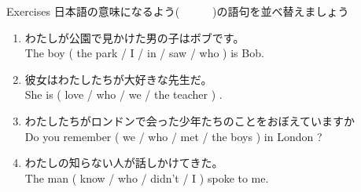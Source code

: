 \documentclass[aspectratio=169,xcolor={dvipsnames,table}]{beamer}
\begin{document}
\begin{frame}[plain]{Exercises}
日本語の意味になるよう(~~~~~~)の語句を並べ替えましょう%
\mbox{}\hfill{\scriptsize {}}
\begin{enumerate}
 \item わたしが公園で見かけた男の子はボブです。\\
       The boy ( the park / I / in / saw / who ) is Bob.\\
 \item 彼女はわたしたちが大好きな先生だ。\\
       She is ( love / who / we / the teacher ) .\\
 \item わたしたちがロンドンで会った少年たちのことをおぼえていますか\\
       Do you remember ( we / who / met / the boys ) in London ?\\
 \item わたしの知らない人が話しかけてきた。\\
       The man ( know / who / didn't / I ) spoke to me.\\
\end{enumerate}
\end{frame}
\end{document}
